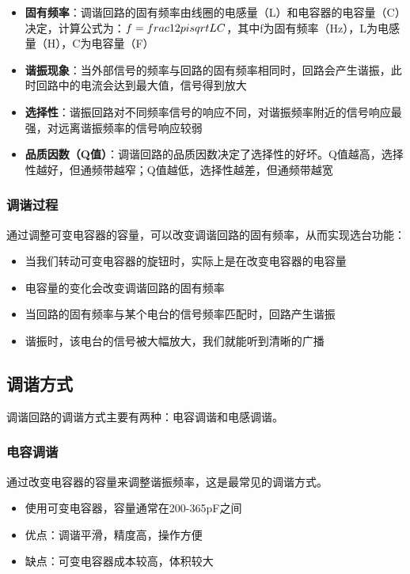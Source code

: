 \documentclass[12pt,UTF8]{ctexbook}
\begin{document}
\begin{itemize}[leftmargin=3.5em]
    \item \textbf{固有频率}：调谐回路的固有频率由线圈的电感量（L）和电容器的电容量（C）决定，计算公式为：$f = \\frac{1}{2\\pi\\sqrt{LC}}$，其中f为固有频率（Hz），L为电感量（H），C为电容量（F）
    \item \textbf{谐振现象}：当外部信号的频率与回路的固有频率相同时，回路会产生谐振，此时回路中的电流会达到最大值，信号得到放大
    \item \textbf{选择性}：谐振回路对不同频率信号的响应不同，对谐振频率附近的信号响应最强，对远离谐振频率的信号响应较弱
    \item \textbf{品质因数（Q值）}：调谐回路的品质因数决定了选择性的好坏。Q值越高，选择性越好，但通频带越窄；Q值越低，选择性越差，但通频带越宽
\end{itemize}

\subsubsection{调谐过程}

通过调整可变电容器的容量，可以改变调谐回路的固有频率，从而实现选台功能：

\begin{itemize}[leftmargin=3.5em]
    \item 当我们转动可变电容器的旋钮时，实际上是在改变电容器的电容量
    \item 电容量的变化会改变调谐回路的固有频率
    \item 当回路的固有频率与某个电台的信号频率匹配时，回路产生谐振
    \item 谐振时，该电台的信号被大幅放大，我们就能听到清晰的广播
\end{itemize}

\subsection{调谐方式}

调谐回路的调谐方式主要有两种：电容调谐和电感调谐。

\subsubsection{电容调谐}

通过改变电容器的容量来调整谐振频率，这是最常见的调谐方式。

\begin{itemize}[leftmargin=3.5em]
    \item 使用可变电容器，容量通常在200-365pF之间
    \item 优点：调谐平滑，精度高，操作方便
    \item 缺点：可变电容器成本较高，体积较大
\end{itemize}
\end{document}
